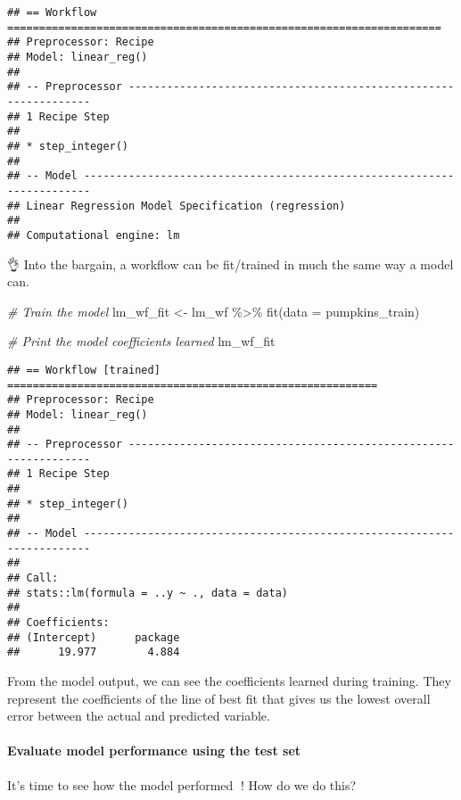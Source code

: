\documentclass[
]{article}
\newenvironment{Shaded}{\begin{snugshade}}{\end{snugshade}}
\newcommand{\AttributeTok}[1]{\textcolor[rgb]{0.77,0.63,0.00}{#1}}
\newcommand{\CommentTok}[1]{\textcolor[rgb]{0.56,0.35,0.01}{\textit{#1}}}
\newcommand{\FunctionTok}[1]{\textcolor[rgb]{0.00,0.00,0.00}{#1}}
\newcommand{\NormalTok}[1]{#1}
\newcommand{\OtherTok}[1]{\textcolor[rgb]{0.56,0.35,0.01}{#1}}
\newcommand{\SpecialCharTok}[1]{\textcolor[rgb]{0.00,0.00,0.00}{#1}}
\begin{document}
\begin{verbatim}
## == Workflow ====================================================================
## Preprocessor: Recipe
## Model: linear_reg()
## 
## -- Preprocessor ----------------------------------------------------------------
## 1 Recipe Step
## 
## * step_integer()
## 
## -- Model -----------------------------------------------------------------------
## Linear Regression Model Specification (regression)
## 
## Computational engine: lm
\end{verbatim}

👌 Into the bargain, a workflow can be fit/trained in much the same way a
model can.

\begin{Shaded}
\begin{Highlighting}[]
\CommentTok{\# Train the model}
\NormalTok{lm\_wf\_fit }\OtherTok{\textless{}{-}}\NormalTok{ lm\_wf }\SpecialCharTok{\%\textgreater{}\%} 
  \FunctionTok{fit}\NormalTok{(}\AttributeTok{data =}\NormalTok{ pumpkins\_train)}

\CommentTok{\# Print the model coefficients learned }
\NormalTok{lm\_wf\_fit}
\end{Highlighting}
\end{Shaded}

\begin{verbatim}
## == Workflow [trained] ==========================================================
## Preprocessor: Recipe
## Model: linear_reg()
## 
## -- Preprocessor ----------------------------------------------------------------
## 1 Recipe Step
## 
## * step_integer()
## 
## -- Model -----------------------------------------------------------------------
## 
## Call:
## stats::lm(formula = ..y ~ ., data = data)
## 
## Coefficients:
## (Intercept)      package  
##      19.977        4.884
\end{verbatim}

From the model output, we can see the coefficients learned during
training. They represent the coefficients of the line of best fit that
gives us the lowest overall error between the actual and predicted
variable.

\hypertarget{evaluate-model-performance-using-the-test-set}{%
\paragraph{Evaluate model performance using the test
set}\label{evaluate-model-performance-using-the-test-set}}

It's time to see how the model performed 📏! How do we do this?
\end{document}
